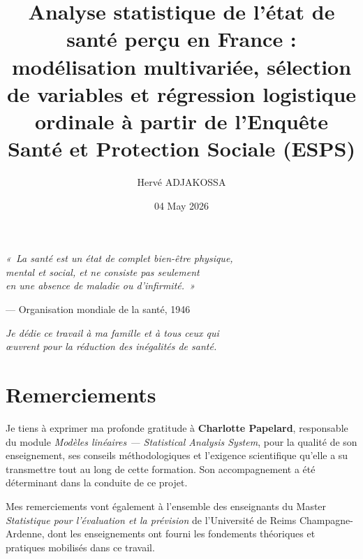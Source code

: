 \documentclass[11pt,a4paper]{memoirerecherche}
\title{Analyse statistique de l'état de santé perçu en France :
modélisation multivariée, sélection de variables et
régression logistique ordinale à partir de l'Enquête
Santé et Protection Sociale (ESPS)}
\author{Hervé ADJAKOSSA}
\date{04 May 2026}
\begin{document}
\maketitle
\newpage

{
\setcounter{tocdepth}{3}
\tableofcontents
\newpage
}



\newpage

\thispagestyle{empty}
\vspace*{\fill}
\begin{flushright}
\textit{«\ La santé est un état de complet bien-être physique,\\
mental et social, et ne consiste pas seulement\\
en une absence de maladie ou d'infirmité.\ »}

\medskip
--- Organisation mondiale de la santé, 1946
\end{flushright}
\vspace{1cm}
\begin{center}
\textit{Je dédie ce travail à ma famille et à tous ceux qui\\
œuvrent pour la réduction des inégalités de santé.}
\end{center}
\vspace*{\fill}

\newpage

\hypertarget{remerciements}{%
\section*{Remerciements}\label{remerciements}}

Je tiens à exprimer ma profonde gratitude à \textbf{Charlotte Papelard}, responsable du module \emph{Modèles linéaires --- Statistical Analysis System}, pour la qualité de son enseignement, ses conseils méthodologiques et l'exigence scientifique qu'elle a su transmettre tout au long de cette formation. Son accompagnement a été déterminant dans la conduite de ce projet.

Mes remerciements vont également à l'ensemble des enseignants du Master \emph{Statistique pour l'évaluation et la prévision} de l'Université de Reims Champagne-Ardenne, dont les enseignements ont fourni les fondements théoriques et pratiques mobilisés dans ce travail.
\end{document}
